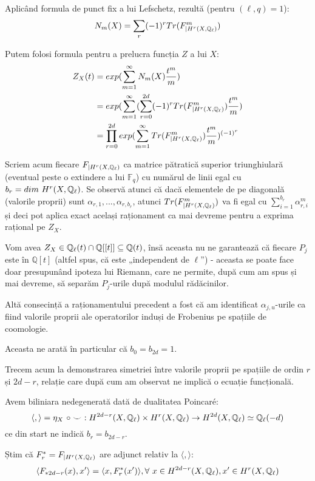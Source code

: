 \documentclass[13pt,openany]{book}
\begin{document}
Aplicând formula de punct fix a lui Lefschetz, rezultă (pentru $(\ell,q)=1$):
$$N_m(X) = \sum\limits_r (-1)^r Tr(F^m_{\mid  H^r(X,\mathbb{Q}_\ell)})$$

Putem folosi formula pentru a prelucra funcția $Z$ a lui $X$:
\begin{align*}
Z_X(t)&=exp(\sum\limits_{m=1}^{\infty} N_m(X) \frac{t^m}{m})\\
&=exp(\sum\limits_{m=1}^{\infty} (\sum\limits_{r=0}^{2d} (-1)^r Tr(F^m_{\mid  H^r(X,\mathbb{Q}_\ell)}) \frac{t^m}{m})\\
&=\prod\limits_{r=0}^{2d}exp(\sum\limits_{m=1}^{\infty}Tr(F^m_{\mid  H^r(X,\mathbb{Q}_\ell)})  \frac{t^m}{m}) ^ { (-1)^r }
\end{align*}

Scriem acum fiecare $F_{\mid  H^r(X,\mathbb{Q}_\ell)}$ ca matrice pătratică superior triunghiulară (eventual peste o extindere a lui $\mathbb{F}_q$) cu numărul de linii egal cu $b_r=dim\ H^r(X,\Qell)$. Se observă atunci că dacă elementele de pe diagonală (valorile proprii) sunt $\alpha_{r,1},...,\alpha_{r,b_r}$, atunci $Tr(F^m_{\mid  H^r(X,\mathbb{Q}_\ell)})$ va fi egal cu $\sum\limits_{i=1}^{b_r} \alpha_{r,i}^m$ și deci pot aplica exact același raționament ca mai devreme pentru a exprima rațional pe $Z_X$.

Vom avea $Z_X \in \mathbb{Q}_\ell(t) \cap \mathbb{Q}[[t]] \subseteq \mathbb{Q}(t)$, însă aceasta nu ne garantează că fiecare $P_j$ este în $\mathbb{Q}[t]$ (altfel spus, că este „independent de $\ell$”) - aceasta se poate face doar presupunând ipoteza lui Riemann, care ne permite, după cum am spus și mai devreme, să separăm $P_j$-urile după modulul rădăcinilor.

Altă consecință a raționamentului precedent a fost că am identificat $\alpha_{j,u}$-urile ca fiind valorile proprii ale operatorilor induși de Frobenius pe spațiile de coomologie.

Aceasta ne arată în particular că $b_0=b_{2d}=1$.

Trecem acum la demonstrarea simetriei între valorile proprii pe spațiile de ordin $r$ și $2d-r$, relație care după cum am observat ne implică o ecuație funcțională.

Avem biliniara nedegenerată dată de dualitatea Poincaré:
$$\langle,\rangle=\eta_X\ \circ \smile\ : H^{2d-r}(X,\mathbb{Q}_\ell) \times H^{r}(X,\mathbb{Q}_\ell) \rightarrow H^{2d}(X,\mathbb{Q}_\ell) \simeq \mathbb{Q}_\ell(-d)$$
ce din start ne indică $b_r=b_{2d-r}$.

Știm că $F^*_r=F_{\mid  H^r(X,\mathbb{Q}_\ell)}$ are adjunct relativ la $\langle,\rangle$:
$$\langle F_{*2d-r}(x),x'\rangle=\langle x,F^*_r(x')\rangle, \forall\ x \in H^{2d-r}(X,\mathbb{Q}_\ell), x' \in H^{r}(X,\mathbb{Q}_\ell)$$
\end{document}
